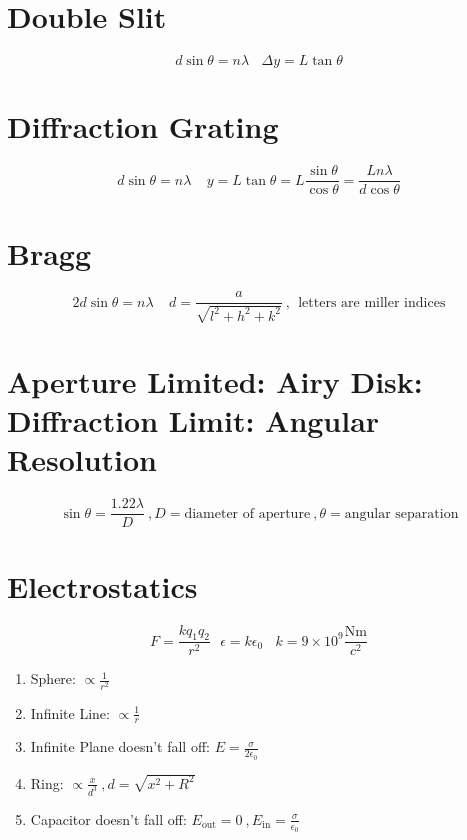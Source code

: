 \documentclass[10pt,letter]{article}
\begin{document}
\section{Double Slit} %
\label{sec:double_slit}
\begin{equation}
    d \sin \theta = n \lambda ~~~~ \Delta y = L \tan \theta
\end{equation}

\section{Diffraction Grating} %
\label{sec:diffraction_grating}
\begin{equation}
    d \sin \theta = n \lambda ~~~~~ y = L \tan \theta = L \frac{\sin \theta}{\cos \theta} = \frac{L n \lambda}{d \cos \theta}
\end{equation}

\section{Bragg} %
\label{sec:bragg}
\begin{equation}
    2d\sin \theta = n\lambda~~~~~ d= \frac{a}{\sqrt{l^2 + h^2 + k^2}}~, ~~ \textrm{letters are miller indices}
\end{equation}

\section{Aperture Limited: Airy Disk: Diffraction Limit: Angular Resolution} %
\label{sec:aperture_limited_airy_disk_diffraction_limit_angular_resolution}
\begin{equation}
    \sin \theta = \frac{1.22 \lambda}{D} ~, D=\textrm{diameter of aperture}~, \theta = \textrm{angular separation}
\end{equation}

\section{Electrostatics} %
\label{sec:electrostatics}
\begin{equation}
    F = \frac{kq_1q_2}{r^2}~~~ \epsilon = k \epsilon_0~~~~ k = 9 \times 10^9 \frac{\textrm{Nm}}{c^2}
\end{equation}
\begin{enumerate}
    \item Sphere: $\propto \frac{1}{r^2}$ 
    \item Infinite Line: $\propto \frac{1}{r}$
    \item Infinite Plane doesn't fall off: $E = \frac{\sigma}{2 \epsilon_0}$
    \item Ring: $ \propto \frac{x}{d^3}~,d = \sqrt{x^2 + R^2}$
    \item Capacitor doesn't fall off: $E_{\textrm{out}} = 0~, E_{\textrm{in}} = \frac{\sigma}{\epsilon_0}$
\end{enumerate}
\end{document}
